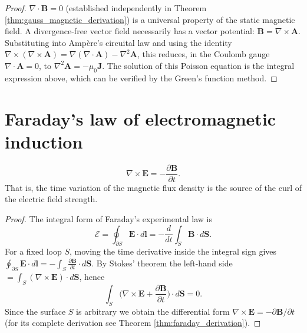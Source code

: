 \begin{proof}
$\nabla \cdot \mathbf{B} = 0$ (established independently in Theorem \ref{thm:gauss_magnetic_derivation}) is a universal property of the static magnetic field. A divergence-free vector field necessarily has a vector potential: $\mathbf{B} = \nabla \times \mathbf{A}$. Substituting into Amp\`ere's circuital law and using the identity $\nabla\times(\nabla\times\mathbf{A}) = \nabla(\nabla\cdot\mathbf{A}) - \nabla^2\mathbf{A}$, this reduces, in the Coulomb gauge $\nabla\cdot\mathbf{A} = 0$, to $\nabla^2\mathbf{A} = -\mu_0\mathbf{J}$. The solution of this Poisson equation is the integral expression above, which can be verified by the Green's function method.
\end{proof}

\section{Faraday's law of electromagnetic induction}

\begin{theorem}\label{thm:faraday_law}
\[
\boxed{\nabla \times \mathbf{E} = -\frac{\partial \mathbf{B}}{\partial t}}.
\]
That is, the time variation of the magnetic flux density is the source of the curl of the electric field strength.
\end{theorem}

\begin{proof}
The integral form of Faraday's experimental law is
\[
\mathcal{E} = \oint_{\partial S} \mathbf{E}\cdot d\mathbf{l} = -\frac{d}{dt}\int_S \mathbf{B}\cdot d\mathbf{S}.
\]
For a fixed loop $S$, moving the time derivative inside the integral sign gives $\oint_{\partial S}\mathbf{E}\cdot d\mathbf{l} = -\int_S \frac{\partial\mathbf{B}}{\partial t}\cdot d\mathbf{S}$. By Stokes' theorem the left-hand side $=\int_S(\nabla\times\mathbf{E})\cdot d\mathbf{S}$, hence
\[
\int_S \Big(\nabla\times\mathbf{E} + \frac{\partial\mathbf{B}}{\partial t}\Big)\cdot d\mathbf{S} = 0.
\]
Since the surface $S$ is arbitrary we obtain the differential form $\nabla\times\mathbf{E} = -\partial\mathbf{B}/\partial t$ (for its complete derivation see Theorem \ref{thm:faraday_derivation}).
\end{proof}

